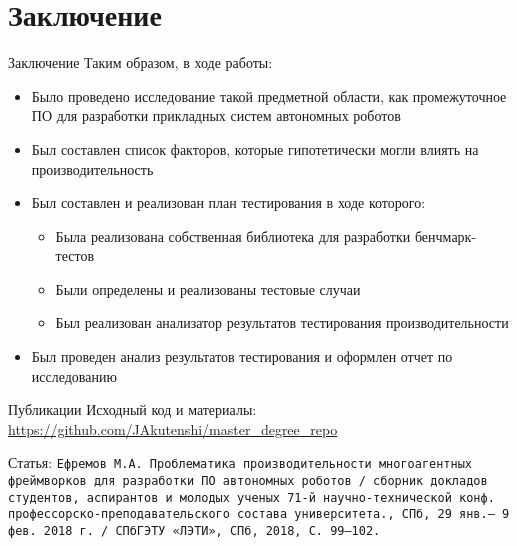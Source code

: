 \section{Заключение}
\begin{frame}{Заключение}
Таким образом, в ходе работы:
\begin{itemize}
	\item Было проведено исследование такой предметной области, как промежуточное ПО для разработки прикладных систем автономных роботов
	\item Был составлен список факторов, которые гипотетически могли влиять на производительность
	\item Был составлен и реализован план тестирования в ходе которого:
	\begin{itemize}
		\item Была реализована собственная библиотека для разработки бенчмарк-тестов
		\item Были определены и реализованы тестовые случаи
		\item Был реализован анализатор результатов тестирования производительности
	\end{itemize}
	\item Был проведен анализ результатов тестирования и оформлен отчет по исследованию
\end{itemize}
\end{frame}

\begin{frame}{Публикации}
Исходный код и материалы: \url{https://github.com/JAkutenshi/master_degree_repo}

\vspace{1cm}
Статья: \texttt{Ефремов М.А. Проблематика производительности многоагентных фреймворков для разработки ПО автономных роботов / сборник докладов студентов, аспирантов и молодых ученых 71-й научно-технической конф. профессорско-преподавательского состава университета., СПб, 29 янв.-- 9 фев. 2018 г. / СПбГЭТУ «ЛЭТИ», СПб, 2018, С. 99–102.}
	
\end{frame}

